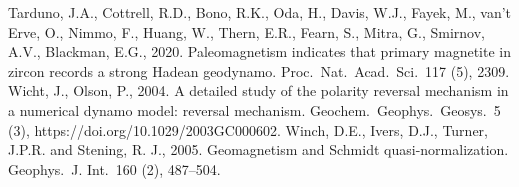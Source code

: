 \begin{thebibliography}{}
%
Tarduno, J.A., Cottrell, R.D., Bono, R.K., Oda, H., Davis, W.J., Fayek, M., van't Erve, O., Nimmo, F., Huang, W., Thern, E.R., Fearn, S., Mitra, G., Smirnov, A.V., Blackman, E.G., 2020. Paleomagnetism indicates that primary magnetite in zircon records a strong Hadean geodynamo. Proc.\ Nat.\ Acad.\ Sci.\ 117 (5), 2309.
%
Wicht, J., Olson, P., 2004. A detailed study of the polarity reversal mechanism in a numerical dynamo model: reversal mechanism. Geochem.\ Geophys.\ Geosys.\ 5 (3), https://doi.org/10.1029/2003GC000602.
%
Winch, D.E., Ivers, D.J., Turner, J.P.R. and Stening, R. J., 2005. Geomagnetism and Schmidt quasi-normalization. Geophys.\ J. Int.\ 160 (2), 487--504.

\end{thebibliography}